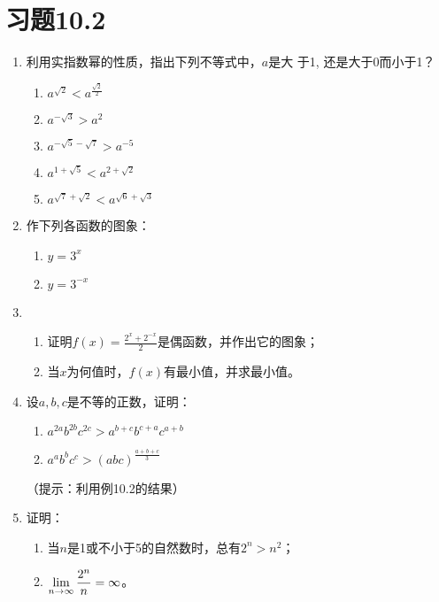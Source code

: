 \section*{习题10.2}
\begin{enumerate}
  \item 利用实指数幂的性质，指出下列不等式中，$a$是大
  于1, 还是大于0而小于1？
\begin{multicols}{2}
  \begin{enumerate}
  \item $a^{\sqrt{2}}<a^{\tfrac{\sqrt{2}}{2}}$
  \item $a^{-\sqrt{3}}>a^2$
  \item $a^{-\sqrt{5}-\sqrt{7}}>a^{-5}$
  \item $a^{1+\sqrt{5}}<a^{2+\sqrt{2}}$
  \item $a^{\sqrt{7}+\sqrt{2}}<a^{\sqrt{6}+\sqrt{3}}$
\end{enumerate}
\end{multicols}

\item 作下列各函数的图象：
\begin{multicols}{2}
  \begin{enumerate}
  \item $y=3^x$
  \item $y=3^{-x}$
\end{enumerate}
\end{multicols}

\item \begin{enumerate}
  \item 证明$f(x)=\frac{2^x+2^{-x}}{2}$是偶函数，并作出它的图象；
  \item 当$x$为何值时，$f(x)$有最小值，并求最小值。
\end{enumerate}

\item 设$a,b,c$是不等的正数，证明：
\begin{enumerate}
  \item $a^{2 a} b^{2 b} c^{2 c}>a^{b+c} b^{c+a} c^{a+b}$
  \item $a^{a} b^{b} c^{c}>(a b c)^{\tfrac{a+b+c}{3}}$
\end{enumerate}
（提示：利用例10.2的结果）

\item 证明：
\begin{enumerate}
  \item 当$n$是1或不小于5的自然数时，总有$2^n>n^2$；
  \item $\displaystyle\lim_{n\to\infty}\dfrac{2^n}{n}=\infty$。
\end{enumerate}
\end{enumerate}

